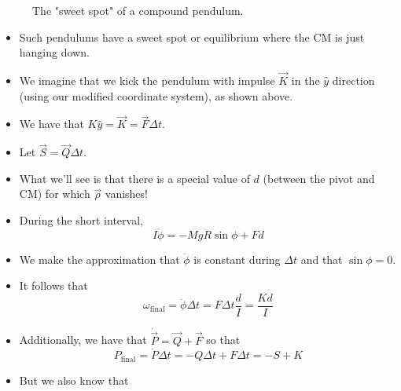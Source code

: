 \documentclass[../notes.tex]{subfiles}
\begin{document}
\begin{itemize}
\begin{figure}[h!]
        \caption{The "sweet spot" of a compound pendulum.}
        \label{fig:compoundPendulum2}
    \end{figure}
    \begin{itemize}
        \item Such pendulums have a sweet spot or equilibrium where the CM is just hanging down.
        \item We imagine that we kick the pendulum with impulse $\vec{K}$ in the $\hat{y}$ direction (using our modified coordinate system), as shown above.
        \item We have that $K\hat{y}=\vec{K}=\vec{F}\Delta t$.
        \item Let $\vec{S}=\vec{Q}\Delta t$.
        \item What we'll see is that there is a special value of $d$ (between the pivot and CM) for which $\vec{\rho}$ vanishes!
        \item During the short interval,
        \begin{equation*}
            I\ddot{\phi} = -MgR\sin\phi+Fd
        \end{equation*}
        \item We make the approximation that $\ddot{\phi}$ is constant during $\Delta t$ and that $\sin\phi=0$.
        \item It follows that
        \begin{equation*}
            \omega_\text{final} = \ddot{\phi}\Delta t
            = F\Delta t\frac{d}{I}
            = \frac{Kd}{I}
        \end{equation*}
        \item Additionally, we have that $\dot{\vec{P}}=\vec{Q}+\vec{F}$ so that
        \begin{equation*}
            P_\text{final} = \dot{P}\Delta t
            = -Q\Delta t+F\Delta t
            = -S+K
        \end{equation*}
        \item But we also know that

\end{itemize}
\end{itemize}
\end{document}
